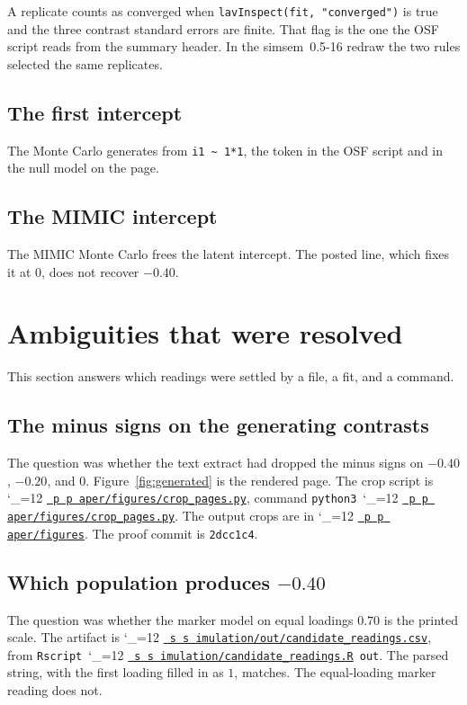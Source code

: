 \documentclass[11pt]{article}
\makeatletter
\newcommand{\proofbase}{https://github.com/alectionary/vibe-math/blob/master/formalization/latent-contrasts}
\def\latent@show#1{%
  \ifx\relax#1\else
    #1\allowbreak
    \expandafter\latent@show
  \fi}
\newcommand{\src}{\begingroup\catcode`\_=12 \latent@src}
\newcommand{\latent@src}[1]{%
  \edef\srcurl{\proofbase/#1}%
  \href{\srcurl}{\texttt{\latent@show#1\relax}}\endgroup}
\newcommand{\srcat}{\begingroup\catcode`\_=12 \latent@srcat}
\newcommand{\latent@srcat}[2]{%
  \edef\srcurl{\proofbase/#1\#L#2}%
  \href{\srcurl}{\texttt{\latent@show#1\relax}}\endgroup}
\newcommand{\srcdir}{\begingroup\catcode`\_=12 \latent@dir}
\newcommand{\latent@dir}[1]{%
  \edef\srcurl{https://github.com/alectionary/vibe-math/tree/master/formalization/latent-contrasts/#1}%
  \href{\srcurl}{\texttt{\latent@show#1\relax}}\endgroup}
\makeatother
\begin{document}
A replicate counts as converged when \texttt{lavInspect(fit, "converged")}
is true and the three contrast standard errors are finite. That flag is
the one the OSF script reads from the summary header. In the
simsem~0.5-16 redraw the two rules selected the same replicates.

\subsection{The first intercept}

The Monte Carlo generates from \texttt{i1 \textasciitilde\ 1*1}, the
token in the OSF script and in the null model on the page.

\subsection{The MIMIC intercept}

The MIMIC Monte Carlo frees the latent intercept. The posted line, which
fixes it at \(0\), does not recover \(-0.40\).

\section{Ambiguities that were resolved}
\label{sec:resolved}

This section answers which readings were settled by a file, a fit, and
a command.

\subsection{The minus signs on the generating contrasts}

The question was whether the text extract had dropped the minus signs
on \(-0.40\), \(-0.20\), and \(0\). Figure~\ref{fig:generated} is the
rendered page. The crop script is \srcat{paper/figures/crop_pages.py}{90},
command \texttt{python3}~\src{paper/figures/crop_pages.py}.
The output crops are in \srcdir{paper/figures}. The proof commit is
\texttt{2dcc1c4}.

\subsection{Which population produces \(-0.40\)}

The question was whether the marker model on equal loadings \(0.70\) is
the printed scale. The artifact is
\src{simulation/out/candidate_readings.csv}, from
\texttt{Rscript}~\srcat{simulation/candidate_readings.R}{103}~\texttt{out}. The parsed string, with the
first loading filled in as \(1\), matches. The equal-loading marker
reading does not.
\end{document}
